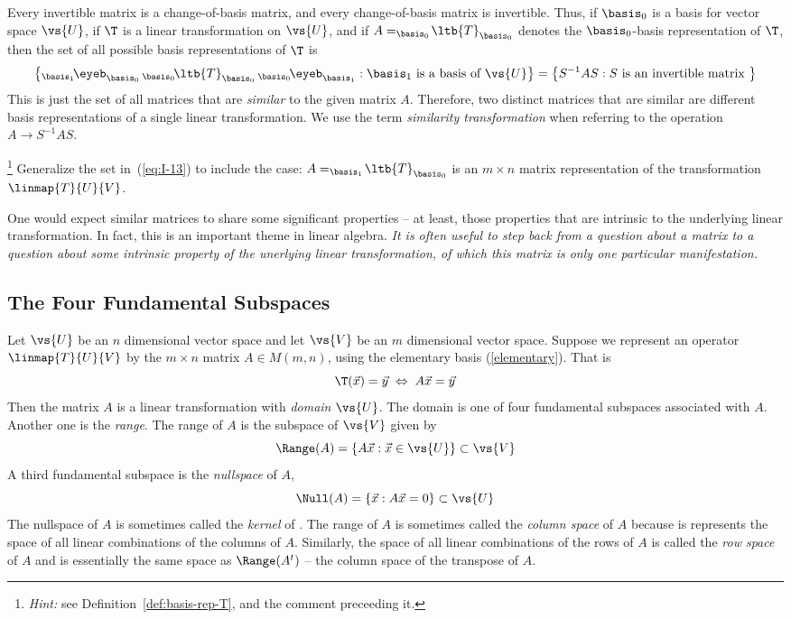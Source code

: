 Every invertible matrix is a change-of-basis matrix, and every
change-of-basis matrix is invertible.  Thus, if $\basis_0$ is a
basis for vector space $\vs{U}$, if $\T$ is a linear transformation on $\vs{U}$,
and if $A = _{\basis_0}\!\ltb{T}_{\basis_0}$ denotes the $\basis_0$-basis
representation of $\T$, then the set of all possible basis representations of
$\T$ is 
\begin{equation}\label{eq:I-13} 
\left\{ 
   _{\basis_1}\!\eyeb_{\basis_0}\, _{\basis_0}\!\ltb{T}_{\basis_0}\, _{\basis_0}\!\eyeb_{\basis_1} : \basis_1 \text{ is a basis of } \vs{U} 
\right\}
=
\left\{ S^{-1} A S : S \mbox{ is an invertible matrix } \right\}
\end{equation}
This is just the set of all matrices that are {\it similar} to the
given matrix $A$.  Therefore, two distinct matrices that are similar are
different basis representations of a single linear transformation.  We use the
term {\it similarity transformation} when referring to the operation 
$A \to S^{-1} A S$. 
\begin{exercise}\footnote{\emph{Hint:} see Definition~\ref{def:basis-rep-T}, and the comment preceeding it.}
Generalize the set in~(\ref{eq:I-13}) to include the case:
$A = _{\basis_1}\!\ltb{T}_{\basis_0}$ is an $m\times n$ matrix representation of the
transformation $\linmap{T}{U}{V}$.
\end{exercise}

One would expect similar matrices to share some significant properties
-- at least, those properties that are intrinsic to the underlying
linear transformation.  In fact, this is an important theme in linear
algebra.  \emph{It is often useful to step back from a question about a
matrix to a question about some intrinsic property of the unerlying linear
transformation, of which this matrix is only one particular manifestation.}

\subsection{The Four Fundamental Subspaces}
\label{subspacetrans}
Let $\vs{U}$ be an $n$ dimensional vector space and let $\vs{V}$ be an $m$
 dimensional vector space.  Suppose we represent an operator 
$\linmap{T}{U}{V}$ by the $m \times n$ matrix
 $A \in M(m,n)$, using the elementary basis (\ref{elementary}).  That is 
\[
\T(\vec{x}) = \vec{y} \; \Leftrightarrow \; A\vec{x} = \vec{y} 
\]
Then the matrix $A$ is a linear transformation with {\it domain}
$\vs{U}$.  The domain is one of four fundamental subspaces associated with $A$.
Another one is the {\it range}. The range of $A$ is the subspace of $\vs{V}$ given by 
\[
\Range(A) = \left\{ A\vec{x} : \vec{x} \in \vs{U} \right\} \subset \vs{V}
\]
A third fundamental subspace is the {\it nullspace} of $A$,
\[
\Null(A) = \left\{\vec{x} : A\vec{x} = 0 \right\} \subset \vs{U}
\]
The nullspace of $A$ is sometimes called the {\it kernel} of \T.
The range of $A$ is sometimes called the {\it column space} of $A$ because is 
represents the space of all linear combinations of the columns of
$A$.  Similarly, the space of all linear combinations of the rows
of $A$ is called the {\it row space} of $A$ and is essentially the same
space as $\Range(A^t)$ -- the column space of the transpose of $A$.

